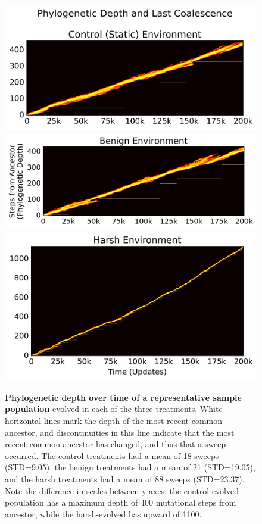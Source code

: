 \documentclass[10pt,letterpaper]{article}
\begin{document}
\begin{figure}[!h]
\includegraphics[trim={-0.88cm 0 0.25cm 0},clip,width=1\columnwidth]{figures/control__phylodepth_with_coalescense.png}
\includegraphics[trim={0.2cm 0 0.25cm 0},clip,width=1\columnwidth]{figures/benign__phylodepth_with_coalescense.png}
\includegraphics[trim={-0.63cm 0 0.25cm 0},clip,width=1\columnwidth]{figures/harsh__phylodepth_with_coalescense.png}

\caption{{\bf Phylogenetic depth over time of a representative sample population} evolved in each of the three treatments. White horizontal lines mark the depth of the most recent common ancestor, and discontinuities in this line indicate that the most recent common ancestor has changed, and thus that a sweep occurred. The control treatments had a mean of 18 sweeps (STD=9.05), the benign treatments had a mean of 21 (STD=19.05), and the harsh treatments had a mean of 88 sweeps (STD=23.37). Note the difference in scales between y-axes: the control-evolved population has a maximum depth of 400 mutational steps from ancestor, while the harsh-evolved has upward of 1100. %
}\label{fig:flamegraph}
\end{figure}
\end{document}
